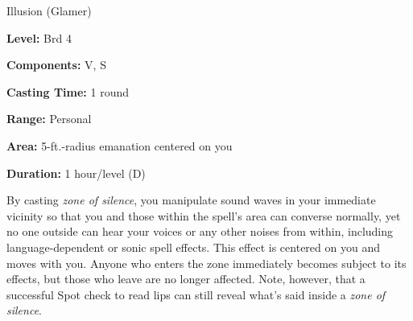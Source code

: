 
Illusion (Glamer)

\textbf{Level:} Brd 4

\textbf{Components:} V, S

\textbf{Casting Time:} 1 round

\textbf{Range:} Personal

\textbf{Area:} 5-ft.-radius emanation centered on you

\textbf{Duration:} 1 hour/level (D)

By casting \textit{zone of silence}, you manipulate sound waves in your immediate 
vicinity so that you and those within the spell's area can converse normally, yet 
no one outside can hear your voices or any other noises from within, including 
language-dependent or sonic spell effects. This effect is centered on you and moves 
with you. Anyone who enters the zone immediately becomes subject to its effects, 
but those who leave are no longer affected. Note, however, that a successful Spot 
check to read lips can still reveal what's said inside a \textit{zone of silence}.

